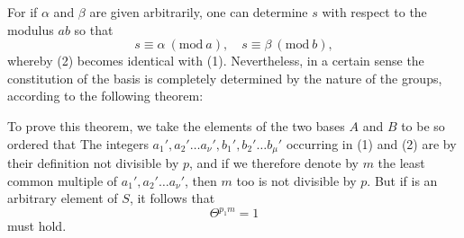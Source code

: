 For if $\alpha$ and $\beta$ are given arbitrarily, one can determine $s$ with respect to the modulus $ab$ so that
\[
s \equiv \alpha \ (\mathrm{mod}\ a), \quad s \equiv \beta \ (\mathrm{mod}\ b),
\]
whereby (2) becomes identical with (1). Nevertheless, in a certain sense the constitution of the basis is completely determined by the nature of the groups, according to the following theorem:


To prove this theorem, we take the elements of the two bases $A$ and $B$ to be so ordered that
The integers $a_1', a_2' \ldots a_\nu', b_1', b_2' \ldots b_\mu'$ occurring in (1) and (2) are by their definition not divisible by $p$, and if we therefore denote by $m$ the least common multiple of $a_1', a_2' \ldots a_\nu'$, then $m$ too is not divisible by $p$. But if
is an arbitrary element of $S$, it follows that
\[
\Theta^{p_1 m} = 1
\]
must hold.
